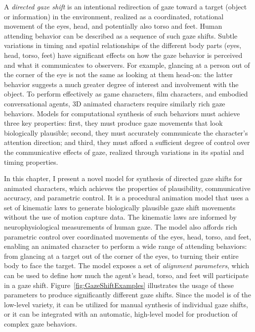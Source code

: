 A \emph{directed gaze shift} is an intentional redirection of gaze toward a target (object or information) in the environment, realized as a coordinated, rotational movement of the eyes, head, and potentially also torso and feet. Human attending behavior can be described as a sequence of such gaze shifts. Subtle variations in timing and spatial relationships of the different body parts (eyes, head, torso, feet) have significant effects on how the gaze behavior is perceived and what it communicates to observers. For example, glancing at a person out of the corner of the eye is not the same as looking at them head-on: the latter behavior suggests a much greater degree of interest and involvement with the object. To perform effectively as game characters, film characters, and embodied conversational agents, 3D animated characters require similarly rich gaze behaviors. Models for computational synthesis of such behaviors must achieve three key properties: first, they must produce gaze movements that look biologically plausible; second, they must accurately communicate the character's attention direction; and third, they must afford a sufficient degree of control over the communicative effects of gaze, realized through variations in its spatial and timing properties.

In this chapter, I present a novel model for synthesis of directed gaze shifts for animated characters, which achieves the properties of plausibility, communicative accuracy, and parametric control. It is a procedural animation model that uses a set of kinematic laws to generate biologically plausible gaze shift movements without the use of motion capture data. The kinematic laws are informed by neurophysiological measurements of human gaze. The model also affords rich parametric control over coordinated movements of the eyes, head, torso, and feet, enabling an animated character to perform a wide range of attending behaviors: from glancing at a target out of the corner of the eyes, to turning their entire body to face the target. The model exposes a set of \emph{alignment parameters}, which can be used to define how much the agent's head, torso, and feet will participate in a gaze shift. Figure~\ref{fig:GazeShiftExamples} illustrates the usage of these parameters to produce significantly different gaze shifts. Since the model is of the low-level variety, it can be utilized for manual synthesis of individual gaze shifts, or it can be integrated with an automatic, high-level model for production of complex gaze behaviors.

